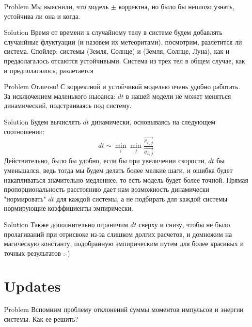 \documentclass{beamer}
\begin{document}
\begin{frame}[fragile]{Problem}
  Мы выяснили, что модель $\pm$ корректна, но было бы неплохо узнать, устойчива ли она и когда.
\end{frame}

\begin{frame}[fragile]{Solution}
  Время от времени к случайному телу в системе будем добавлять случанйные флуктуации
  (и назовем их метеоритами), посмотрим, разлетится ли система.\newline
  Спойлер: системы (Земля, Солнце) и (Земля, Солнце, Луна), как и предаолагалось отсаются устойчивыми.
  Система из трех тел в общем случае, как и предполагалось, разлетается
\end{frame}

\begin{frame}[fragile]{Problem}
  Отлично! С корректной и устойчивой моделью очень удобно работать. За исключением маленького ньюанса:
  $dt$ в нашей модели не может меняться динамический, подстраиваясь под систему.
\end{frame}

\begin{frame}[fragile]{Solution}
  Будем вычислять $dt$ динамически, основываясь на следующем соотношении:
  \[dt \sim \min_i \min_j \dfrac{\overrightarrow{r_{i,j}}}{\overrightarrow{v_{i,j}}}\]
  Действительно, было бы удобно, если бы при увеличении скорости, $dt$ бы уменьшался,
  ведь тогда мы будем делать более мелкие шаги, и ошибка будет накапливаться значительно медленнее,
  то есть модель будет более точной.\newline
  Прямая пропорциональность расстоянию дает нам возможность динамически "нормировать" $dt$ для каждой системы,
  а не подбирать для каждой системы нормирующие коэффициенты эмпирически.
\end{frame}

\begin{frame}[fragile]{Solution}
  Также дополнительно ограничим $dt$ сверху и снизу, чтобы не было пролагиваний при отрисвоке
  из-за слишком долгих расчетов, и домножим на магическую константу, подобранную эмпирическим
  путем для более красивых и точных результатов :-)
\end{frame}

\section{Updates}

\begin{frame}[fragile]{Problem}
  Вспомним проблему отклонений суммы моментов импульсов и энергии системы. Как ее решить?
\end{frame}
\end{document}
